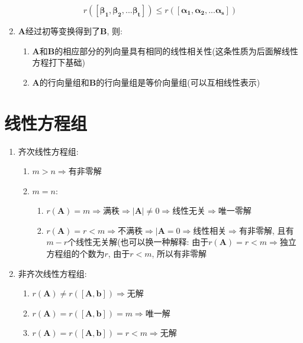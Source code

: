 \begin{enumerate}
\begin{equation*}
r([\bm{\beta_{1}},\bm{\beta_{2}},...\bm{\beta_{t}}])\le r([\bm{\alpha_{1}},\bm{\alpha_{2}},...\bm{\alpha_{s}}])
\end{equation*}
\item $\bm{A}$经过初等变换得到了$\bm{B}$, 则:
\begin{enumerate}
\item $\bm{A}$和$\bm{B}$的相应部分的列向量具有相同的线性相关性(这条性质为后面解线性方程打下基础)
\item $\bm{A}$的行向量组和$\bm{B}$的行向量组是等价向量组(可以互相线性表示)
\end{enumerate}
\end{enumerate}
\chapter{线性方程组}
\begin{enumerate}
\item 齐次线性方程组:
\begin{enumerate}
\item $m>n\Rightarrow $有非零解
\item $m=n$:
\begin{enumerate}
\item $r(\bm{A})=m\Rightarrow$满秩$\Rightarrow |\bm{A}|\neq 0 \Rightarrow$线性无关$\Rightarrow$唯一零解
\item $r(\bm{A})=r<m\Rightarrow$不满秩$\Rightarrow |\bm{A}=0\Rightarrow$线性相关$\Rightarrow$有非零解, 且有$m-r$个线性无关解(也可以换一种解释: 由于$r(\bm{A})=r<m\Rightarrow$独立方程组的个数为$r$, 由于$r<m$, 所以有非零解
\end{enumerate}
\end{enumerate}
\item 非齐次线性方程组:
\begin{enumerate}
\item $r(\bm{A})\neq r([\bm{A},\bm{b}])\Rightarrow$无解
\item $r(\bm{A})=r([\bm{A},\bm{b}])=m\Rightarrow$唯一解
\item $r(\bm{A})=r([\bm{A},\bm{b}])=r<m\Rightarrow$无解
\end{enumerate}
\end{enumerate}